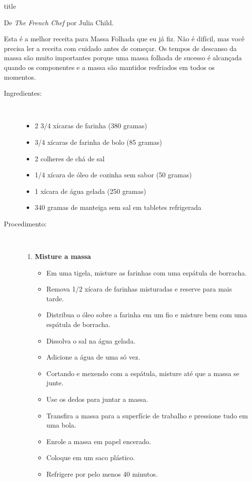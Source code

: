 \documentclass [11pt, letterpaper] {article}
\begin{document}
 {title}

\begin {flushright}
De {\it The French Chef} por Julia Child.
\end {flushright}
 
Esta é a melhor receita para Massa Folhada que eu já fiz. Não é difícil, mas você precisa ler a receita com cuidado antes de começar. Os tempos de descanso da massa são muito importantes porque uma massa folhada de sucesso é alcançada quando os componentes e a massa são mantidos resfriados em todos os momentos.

\begin {description}

\item [Ingredientes:] \ \\
\begin {itemize}
\item 2 3/4 xícaras de farinha (380 gramas)
\item 3/4 xícaras de farinha de bolo (85 gramas)
\item 2 colheres de chá de sal
\item 1/4 xícara de óleo de cozinha sem sabor (50 gramas)
\item 1 xícara de água gelada (250 gramas)
\item 340 gramas de manteiga sem sal em tabletes refrigerada
\end {itemize}

\item [Procedimento:] \ \\
\begin {enumerate}
\item {\bf Misture a massa}
\begin {itemize}
\item Em uma tigela, misture as farinhas com uma espátula de borracha.
\item Remova 1/2 xícara de farinhas misturadas e reserve para mais tarde.
\item Distribua o óleo sobre a farinha em um fio e misture bem com uma espátula de borracha.
\item Dissolva o sal na água gelada.
\item Adicione a água de uma só vez.
\item Cortando e mexendo com a espátula, misture até que a massa se junte.
\item Use os dedos para juntar a massa.
\item Transfira a massa para a superfície de trabalho e pressione tudo em uma bola.
\item Enrole a massa em papel encerado.
\item Coloque em um saco plástico.
\item Refrigere   por pelo menos 40 minutos.
\end {itemize}



\end{enumerate}
\end{description}
\end{document}
